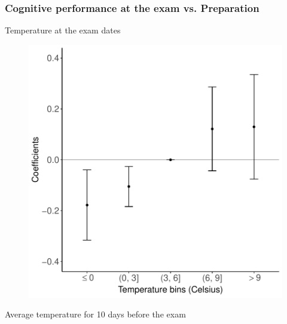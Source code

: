 \documentclass[9pt, pdfmx,hiresbb]{beamer}
\begin{document}
\begin{frame}\frametitle{Cognitive performance at the exam vs. Preparation}
  \begin{minipage}{0.49\textwidth}
    \begin{center}
      Temperature at the exam dates
    \end{center}
    \begin{figure}[h]
      \centering
      \includegraphics[width = \textwidth]{../Output/images/reg_pre10_exam_4.pdf}
    \end{figure}
  \end{minipage}
  \begin{minipage}{0.49\textwidth}
    \begin{center}
      Average temperature for 10 days before the exam
    \end{center}
    \begin{figure}[h]

\end{figure}
\end{minipage}
\end{frame}
\end{document}
